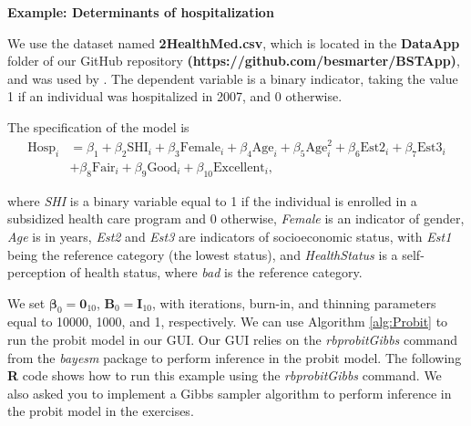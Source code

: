 \textbf{Example: Determinants of hospitalization}

We use the dataset named \textbf{2HealthMed.csv}, which is located in the \textbf{DataApp} folder of our GitHub repository \textbf{(https://github.com/besmarter/BSTApp)}, and was used by \cite{Ramirez2013}. The dependent variable is a binary indicator, taking the value 1 if an individual was hospitalized in 2007, and 0 otherwise.

The specification of the model is
\begin{align*}
	\text{Hosp}_i&={\beta}_1+{\beta}_2\text{SHI}_i+{\beta}_3\text{Female}_i+{\beta}_4\text{Age}_i+{\beta}_5\text{Age}_i^2+{\beta}_6\text{Est2}_i+{\beta}_7\text{Est3}_i\\
	&+{\beta}_8\text{Fair}_i+{\beta}_9\text{Good}_i+{\beta}_{10}\text{Excellent}_i,
\end{align*}

where \textit{SHI} is a binary variable equal to 1 if the individual is enrolled in a subsidized health care program and 0 otherwise, \textit{Female} is an indicator of gender, \textit{Age} is in years, \textit{Est2} and \textit{Est3} are indicators of socioeconomic status, with \textit{Est1} being the reference category (the lowest status), and \textit{HealthStatus} is a self-perception of health status, where \textit{bad} is the reference category.

We set $\bm{\beta}_0 = {\bm{0}}_{10}$, ${\bm{B}}_0 = {\bm{I}}_{10}$, with iterations, burn-in, and thinning parameters equal to 10000, 1000, and 1, respectively. We can use Algorithm \ref{alg:Probit} to run the probit model in our GUI. Our GUI relies on the \textit{rbprobitGibbs} command from the \textit{bayesm} package to perform inference in the probit model. The following \textbf{R} code shows how to run this example using the \textit{rbprobitGibbs} command. We also asked you to implement a Gibbs sampler algorithm to perform inference in the probit model in the exercises.

